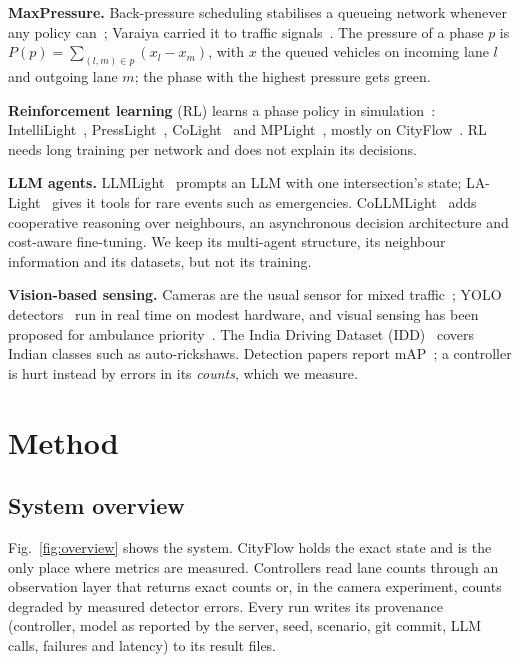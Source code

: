 \documentclass[conference]{IEEEtran}
\begin{document}
\textbf{MaxPressure.} Back-pressure scheduling stabilises a queueing network whenever any policy
can~\cite{tassiulas1992}; Varaiya carried it to traffic signals~\cite{varaiya2013maxpressure}.
The pressure of a phase $p$ is $P(p)=\sum_{(l,m)\in p}(x_l-x_m)$, with $x$ the queued vehicles on
incoming lane $l$ and outgoing lane $m$; the phase with the highest pressure gets green.

\textbf{Reinforcement learning} (RL) learns a phase policy in simulation~\cite{wei2021survey}:
IntelliLight~\cite{wei2018intellilight}, PressLight~\cite{wei2019presslight},
CoLight~\cite{wei2019colight} and MPLight~\cite{chen2020mplight}, mostly on
CityFlow~\cite{zhang2019cityflow}. RL needs long training per network and does not explain its
decisions.

\textbf{LLM agents.} LLMLight~\cite{lai2023llmlight} prompts an LLM with one intersection's
state; LA-Light~\cite{wang2024lalight} gives it tools for rare events such as emergencies.
CoLLMLight~\cite{yuan2026collmlight} adds cooperative reasoning over neighbours, an asynchronous
decision architecture and cost-aware fine-tuning. We keep its multi-agent structure, its
neighbour information and its datasets, but not its training.

\textbf{Vision-based sensing.} Cameras are the usual sensor for mixed
traffic~\cite{buch2011review}; YOLO detectors~\cite{redmon2016yolo,jocher2023yolov8} run in real
time on modest hardware, and visual sensing has been proposed for ambulance
priority~\cite{nellore2016emergency}. The India Driving Dataset (IDD)~\cite{varma2019idd}
covers Indian classes such as auto-rickshaws. Detection papers report mAP~\cite{lin2014coco};
a controller is hurt instead by errors in its \emph{counts}, which we measure.

\section{Method}

\subsection{System overview}
Fig.~\ref{fig:overview} shows the system. CityFlow holds the exact state and is the only place
where metrics are measured. Controllers read lane counts through an observation layer that
returns exact counts or, in the camera experiment, counts degraded by measured detector errors.
Every run writes its provenance (controller, model as reported by the server, seed, scenario,
git commit, LLM calls, failures and latency) to its result files.
\end{document}
